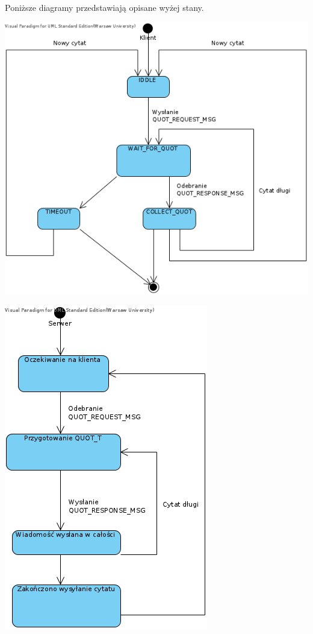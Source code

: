 \documentclass{article}
\begin{document}
Poniższe diagramy przedstawiają opisane wyżej stany.
\begin{center}
\includegraphics[scale=2]{klient.png}
\end{center}
\begin{center}
\includegraphics[scale=2]{serwer.png}
\end{center}
\end{document}
